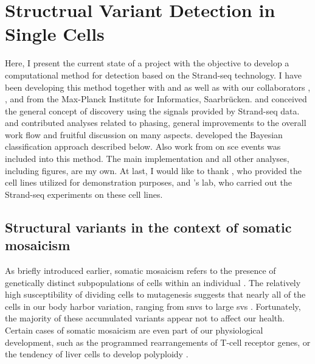 \chapter{Structrual Variant Detection in Single Cells}
\label{sec:mosaicatcher}

Here, I present the current state of a project with the objective to develop a
computational method for \sv detection based on the Strand-seq technology. I have been developing this method
together with \jan and \ashley as well as with our collaborators
\david, \maryam, and \marschall from the Max-Planck Institute for Informatics,
Saarbrücken. \ashley and \jan conceived the general concept of \sv discovery
using the signals provided by Strand-seq data. \marschall and \david
contributed analyses related to phasing, general improvements to the overall
work flow and fruitful discussion on many aspects. \maryam developed the
Bayesian classification approach described below. Also work from \venla on
\acl{sce} events was included into this method.
The main implementation and all other analyses, including figures, are my own.
At last, I would like to thank \balca, who provided the cell lines utilized for
demonstration purposes, and \landsdorp's lab, who carried out the Strand-seq
experiments on these cell lines.





\section{Structural variants in the context of somatic mosaicism}
\label{sec:mosaic_mosaicism}

As briefly introduced earlier, somatic mosaicism refers to the presence of
genetically distinct subpopulations of cells within an individual
\citep{Youssoufian2002}. The relatively high susceptibility of dividing cells to mutagenesis
suggests that nearly all of the cells in our body harbor variation, ranging from \acp{snv}
to large \acp{sv} \citep{Campbell2015}. Fortunately, the majority of these
accumulated variants appear not to affect our health. Certain cases of somatic mosaicism are even
part of our physiological development, such as the programmed rearrangements of
T-cell receptor genes, or the tendency of liver cells to develop polyploidy
\citep{Forsberg2017,Davoli2011}.

